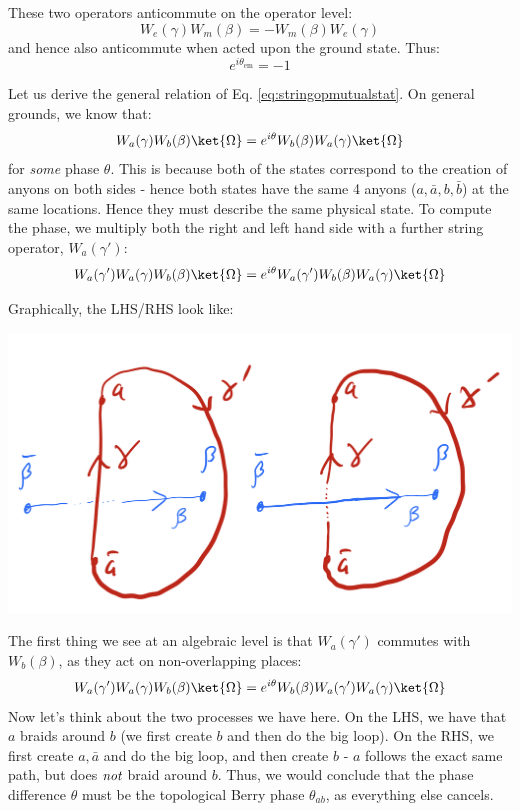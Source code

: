 These two operators anticommute on the operator level:
\begin{equation}
    W_e(\gamma)W_m(\beta) = -W_m(\beta)W_e(\gamma)
\end{equation}
and hence also anticommute when acted upon the ground state. Thus:
\begin{equation}
    e^{i\theta_{\text{em}}} = -1
\end{equation}

Let us derive the general relation of Eq. \eqref{eq:stringopmutualstat}. On general grounds, we know that:
\begin{equation}
    W_a(\gamma)W_b(\beta)\ket{\Omega} = e^{i\theta}W_b(\beta)W_a(\gamma)\ket{\Omega}
\end{equation}
for \emph{some} phase $\theta$. This is because both of the states correspond to the creation of anyons on both sides - hence both states have the same 4 anyons ($a, \bar{a}, b, \bar{b}$) at the same locations. Hence they must describe the same physical state. To compute the phase, we multiply both the right and left hand side with a further string operator, $W_a(\gamma')$:
\begin{equation}
    W_a(\gamma')W_a(\gamma)W_b(\beta)\ket{\Omega} = e^{i\theta} W_a(\gamma')W_b(\beta)W_a(\gamma)\ket{\Omega}
\end{equation}

Graphically, the LHS/RHS look like:

\begin{center}
    \includegraphics[scale=0.35]{Lectures/Images/lec6-braid.png}
\end{center}

The first thing we see at an algebraic level is that $W_a(\gamma')$ commutes with $W_b(\beta)$, as they act on non-overlapping places:
\begin{equation}
    W_a(\gamma')W_a(\gamma)W_b(\beta)\ket{\Omega} = e^{i\theta} W_b(\beta)W_a(\gamma')W_a(\gamma)\ket{\Omega}
\end{equation}
Now let's think about the two processes we have here. On the LHS, we have that $a$ braids around $b$ (we first create $b$ and then do the big loop). On the RHS, we first create $a, \bar{a}$ and do the big loop, and then create $b$ - $a$ follows the exact same path, but does $\emph{not}$ braid around $b$. Thus, we would conclude that the phase difference $\theta$ must be the topological Berry phase $\theta_{ab}$, as everything else cancels.

